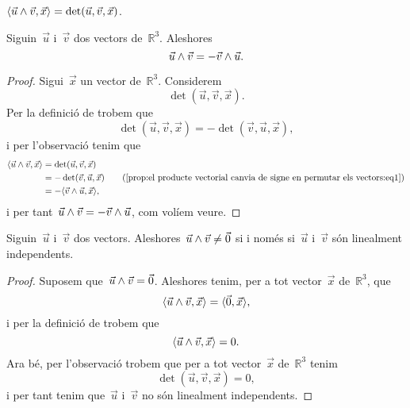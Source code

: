 \documentclass[../../main.tex]{subfiles}
\begin{document}
    \begin{observation}
        \label{obs:fórmula del determinant segons el producte vectorial i el producte escalar}
        \(\prodesc{\vec{u}\prodvec\vec{v}}{\vec{x}}=\det(\vec{u},\vec{v},\vec{x})\).
    \end{observation}
    \begin{proposition}
    \label{prop:el producte vectorial canvia de signe en permutar els vectors}
        Siguin~\(\vec{u}\) i~\(\vec{v}\) dos vectors de~\(\mathbb{R}^{3}\).
        Aleshores
        \[
            \vec{u}\mathbin{\wedge}\vec{v}=-\vec{v}\mathbin{\wedge}\vec{u}.
        \]
    \end{proposition}
    \begin{proof}
        Sigui~\(\vec{x}\) un vector de~\(\mathbb{R}^{3}\).
        Considerem
        \[
            \det(\vec{u},\vec{v},\vec{x}).
        \]
        Per la definició de  trobem que %
        \begin{equation}
            \label{prop:el producte vectorial canvia de signe en permutar els vectors:eq1}
            \det(\vec{u},\vec{v},\vec{x})=-\det(\vec{v},\vec{u},\vec{x}),
        \end{equation}
        i per l'observació  tenim que
        \begin{align*}
            \prodesc{\vec{u}\prodvec\vec{v}}{\vec{x}}&=\det(\vec{u},\vec{v},\vec{x}) \\
            &=-\det(\vec{v},\vec{u},\vec{x}) \tag{\ref{prop:el producte vectorial canvia de signe en permutar els vectors:eq1}}\\
            &=-\prodesc{\vec{v}\prodvec\vec{u}}{\vec{x}},
        \end{align*}
        i per tant~\(\vec{u}\mathbin{\wedge}\vec{v}=-\vec{v}\mathbin{\wedge}\vec{u}\), com volíem veure.
    \end{proof}
    \begin{proposition}
        \label{prop:el producte vectorial és zero si i només si els vectors no són linealment independents}
        Siguin~\(\vec{u}\) i~\(\vec{v}\) dos vectors.
        Aleshores~\(\vec{u}\mathbin{\wedge}\vec{v}\neq\vec{0}\) si i només si~\(\vec{u}\) i~\(\vec{v}\) són linealment independents.
    \end{proposition}
    \begin{proof}
        Suposem que~\(\vec{u}\mathbin{\wedge}\vec{v}=\vec{0}\).
        Aleshores tenim, per a tot vector~\(\vec{x}\) de~\(\mathbb{R}^{3}\), que
        \[
            \prodesc{\vec{u}\prodvec\vec{v}}{\vec{x}}=\prodesc{\vec{0}}{\vec{x}},
        \]
        i per la definició de  trobem que
        \[
            \prodesc{\vec{u}\prodvec\vec{v}}{\vec{x}}=0.
        \]
        Ara bé, per l'observació  trobem que per a tot vector~\(\vec{x}\) de~\(\mathbb{R}^{3}\) tenim
        \[
            \det(\vec{u},\vec{v},\vec{x})=0,
        \]
        i per tant tenim que~\(\vec{u}\) i~\(\vec{v}\) no són linealment independents.
    \end{proof}
\end{document}
